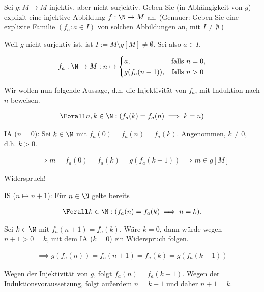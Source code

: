 
\begin{exercise}[270]

Sei $g: M \to M$ injektiv, aber nicht surjektiv. Geben Sie (in Abhängigkeit von $g$)
explizit eine injektive Abbildung $f: \N \to M$ an.
(Genauer: Geben Sie eine explizite Familie $(f_a: a \in I)$ von solchen Abbildungen
an, mit $I \neq \emptyset$.)

\end{exercise}


\begin{solution}

Weil $g$ nicht surjektiv ist, ist $I := M \setminus g[M] \neq \emptyset$.
Sei also $a \in I$.

\begin{align*}
    f_a:
    \N \to M:
    n
    \mapsto
	\begin{cases}
		a,             & \text{falls}~ n = 0, \\
		g(f_a(n - 1)), & \text{falls}~ n > 0 
	\end{cases}
\end{align*}

Wir wollen nun folgende Aussage, d.h. die Injektivität von $f_a$, mit Induktion nach $n$ beweisen.

\begin{align*}
    \Forall n, k \in \N:
    (f_a(k) = f_a(n) \implies k = n)
\end{align*}

IA ($n = 0$):
Sei $k \in \N$ mit $f_a(0) = f_a(n) = f_a(k)$.
Angenommen, $k \neq 0$, d.h. $k > 0$.

\begin{align*}
    \implies
    m = f_a(0) = f_a(k) = g(f_a(k - 1))
    \implies
    m \in g[M]
\end{align*}

Widerspruch!

IS ($n \mapsto n + 1$):
Für $n \in \N$ gelte bereits

\begin{align*}
    \Forall k \in \N:
    (f_a(n) = f_a(k) \implies n = k).
\end{align*}

Sei $k \in \N$ mit $f_a(n + 1) = f_a(k)$.
Wäre $k = 0$, dann würde wegen $n + 1 > 0 = k$, mit dem IA ($k = 0$) ein Widerspruch folgen.

\begin{align*}
    \implies
	g(f_a(n)) = f_a(n + 1) = f_a(k) = g(f_a(k - 1))
\end{align*}

Wegen der Injektivität von $g$, folgt $f_a(n) = f_a(k - 1)$.
Wegen der Induktionsvoraussetzung, folgt außerdem $n = k - 1$ und daher $n + 1 = k$. 

\end{solution}
